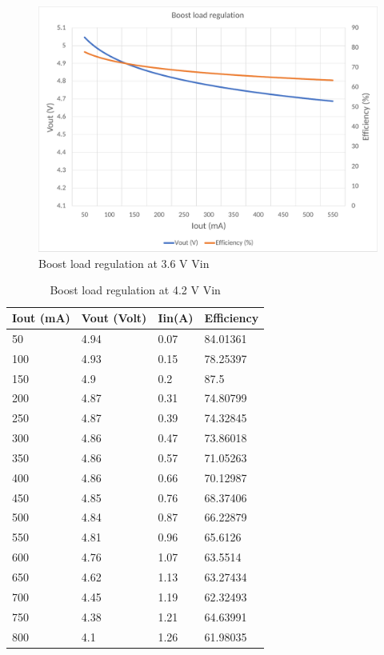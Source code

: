 \begin{figure}[H]
	\centering
	\includegraphics[width=\columnwidth]{IMGS/Boost load regulation at 3.6V Vin.pdf}
	\caption{Boost load regulation at 3.6 V Vin}
	\label{fig:arch}
\end{figure}
\begin{table}[H]
\centering
\begin{tabular}{|l|l|l|l|}
\hline
Iout (mA) & Vout (Volt) & Iin(A) & Efficiency \\ \hline
50        & 4.94        & 0.07   & 84.01361   \\ \hline
100       & 4.93        & 0.15   & 78.25397   \\ \hline
150       & 4.9         & 0.2    & 87.5       \\ \hline
200       & 4.87        & 0.31   & 74.80799   \\ \hline
250       & 4.87        & 0.39   & 74.32845   \\ \hline
300       & 4.86        & 0.47   & 73.86018   \\ \hline
350       & 4.86        & 0.57   & 71.05263   \\ \hline
400       & 4.86        & 0.66   & 70.12987   \\ \hline
450       & 4.85        & 0.76   & 68.37406   \\ \hline
500       & 4.84        & 0.87   & 66.22879   \\ \hline
550       & 4.81        & 0.96   & 65.6126    \\ \hline
600       & 4.76        & 1.07   & 63.5514    \\ \hline
650       & 4.62        & 1.13   & 63.27434   \\ \hline
700       & 4.45        & 1.19   & 62.32493   \\ \hline
750       & 4.38        & 1.21   & 64.63991   \\ \hline
800       & 4.1         & 1.26   & 61.98035   \\ \hline
\end{tabular}
\caption{Boost load regulation at 4.2 V Vin}
\label{table:4}
\end{table}
